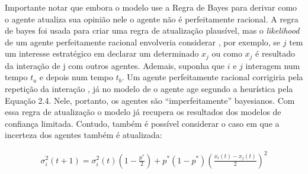   Importante notar que embora o modelo use a Regra de Bayes para derivar como o
  agente atualiza sua opinião nele o agente não é perfeitamente racional. A
  regra de bayes foi usada para criar uma regra de atualização plausível, mas o
  \textit{likelihood} de um agente perfeitamente racional envolveria considerar
  , por exemplo, se \(j\) tem um interesse estratégico em declarar um
  determinado \(x_j\) ou como \(x_j\) é resultado da interação de j com outros
  agentes. Ademais, suponha que \(i\) e \(j\) interagem num tempo \(t_a\) e
  depois num tempo \(t_b\). Um agente perfeitamente racional corrigiria pela
  repetição da interação \cite{acemoglu2011opinion}, já no modelo de
   o agente age segundo a heurística pela
  Equação 2.4. Nele, portanto, os agentes são ``imperfeitamente'' bayesianos.
  Com essa regra de atualização o modelo já recupera os resultados dos modelos
  de confiança limitada. Contudo, também é possível considerar o caso em que a
  incerteza dos agentes também é atualizada:

      \begin{align*}
    \sigma_i^2(t+1)
    =
    \sigma_i^2(t)
    (1 - \frac{p^*}{2})
    +
    p^*
    (1-p^*)
    (\frac{x_i(t)-x_j(t)}{2})^2
  \end{align*}

